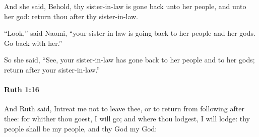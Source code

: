 			\begin{versebox}
					\item[BHS] 
					\item[LXX] 
					\item[ASV] And she said, Behold, thy sister-in-law is gone back unto her people, and unto her god: return thou after thy sister-in-law.
					\item[NIV] “Look,” said Naomi, “your sister-in-law is going back to her people and her gods. Go back with her.”
					\item[NRSV] So she said, “See, your sister-in-law has gone back to her people and to her gods; return after your sister-in-law.”
			\end{versebox}

		\paragraph{Ruth 1:16} %
			\label{RUTH-1-16}

			And Ruth said, Intreat me not to leave thee, or to return from following after thee: for whither thou goest, I will go; and where thou lodgest, I will lodge: thy people shall be my people, and thy God my God:

